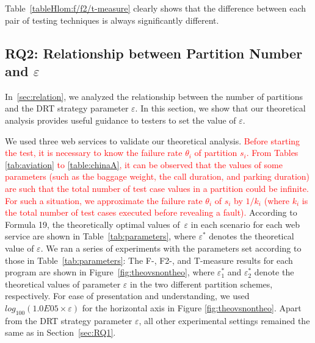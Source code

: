 \documentclass[10pt,journal,compsoc]{IEEEtran}
\begin{document}
Table~\ref{tableHlom:f/f2/t-measure} clearly shows that the difference between each pair of testing techniques is always significantly different.

\subsection{RQ2: Relationship between Partition Number and $\varepsilon$}
\label{sec:RQ2}

In~\ref{sec:relation}, we analyzed the relationship between the number of partitions and the DRT strategy parameter $\varepsilon$.
In this section, we show that our theoretical analysis provides useful guidance to testers to set the value of $\varepsilon$.

We used three web services to validate our theoretical analysis.
\textcolor{red}{Before starting the test, it is necessary to know the failure rate $\theta_i$ of partition $s_i$. From Tables \ref{tab:aviation} to \ref{table:chinaA}, it can be observed that the values of some parameters (such as the baggage weight, the call duration, and parking duration) are such that the total number of test case values in a partition could be infinite. For such a situation, we approximate the failure rate $\theta_i$ of $s_i$ by $1 / k_i$ (where $k_i$ is the total number of test cases executed before revealing a fault).}
According to Formula 19, the theoretically optimal values of~$\varepsilon$ in each scenario for each web service are shown in Table~\ref{tab:parameters}, where $\varepsilon^{*}$ denotes the theoretical value of $\varepsilon$.
We ran a series of experiments with the parameters set according to those in Table~\ref{tab:parameters}:
The F-, F2-, and T-measure results for each  program are shown in Figure~\ref{fig:theovsnontheo}, where $\varepsilon_1^{*}$ and $\varepsilon_2^{*}$ denote the theoretical values of parameter $\varepsilon$ in the two different partition schemes, respectively.
For ease of presentation and understanding, we used $log_{100}(1.0E05 \times \varepsilon)$ for the horizontal axis in Figure \ref{fig:theovsnontheo}.
Apart from the DRT strategy parameter $\varepsilon$, all other experimental settings remained the same as in Section~\ref{sec:RQ1}.
\end{document}
